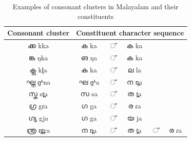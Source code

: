 \documentclass{ieeeaccess}
\begin{document}
\begin{table}[h]
	\begin{center}
		\begin{minipage}{210pt}
			\caption{Examples of consonant clusters in Malayalam and their constituents}\label{consonantclusters}%
            \label{complexgraphemetable}
			\begin{tabular}{@{}c|ccccc@{}}
				\hline \hline
				\textbf{Consonant cluster}      & \multicolumn{5}{c}{\textbf{Constituent character sequence}}                                                               \\
				\hline
				{\mal ക്ക} {\ipa kka}   & {\mal ക} {\ipa ka}                                 & {\mal ്} & {\mal ക} {\ipa ka}                                \\
				{\mal ങ്ക} {\ipa ŋka}   & {\mal ങ} {\ipa ŋa}                                 & {\mal ്} & {\mal ക} {\ipa ka}                                \\
				{\mal ക്ല} {\ipa kɭa}   & {\mal ക} {\ipa ka}                                 & {\mal ്} & {\mal ല} {\ipa la}                                \\
				{\mal ഘ്ന} {\ipa ɡʱna}  & {\mal ഘ} {\ipa ɡʱa}                                & {\mal ്} & {\mal ന} {\ipa n̪a}                                \\
				{\mal സ്ത} {\ipa st̪a}   & {\mal സ} {\ipa sa}                                 & {\mal ്} & {\mal ത} {\ipa t̪a}                                \\
				{\mal ഗ്ര} {\ipa gɾa}   & {\mal ഗ} {\ipa ga }                                & {\mal ്} & {\mal ര} {\ipa ɾa}                                \\
				{\mal ഗ്യ} {\ipa gja}   & {\mal ഗ} {\ipa ga}                                 & {\mal ്} & {\mal യ} {\ipa ja}                                \\
				{\mal ന്ത്ര} {\ipa n̪t̪ra} & {\mal ന} {\ipa n̪a}                                 & {\mal ്} & {\mal ത} {\ipa t̪a} & {\mal ്} & {\mal ര} {\ipa ɾa} \\
\hline
				\hline
			\end{tabular}
		\end{minipage}
	\end{center}
\end{table}


\end{document}

